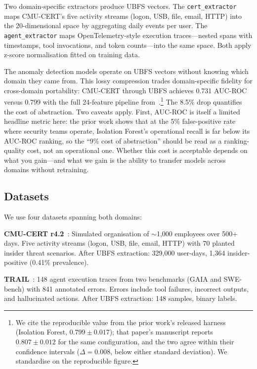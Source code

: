 \documentclass[conference]{IEEEtran}
\begin{document}
Two domain-specific extractors produce UBFS vectors. The \texttt{cert\_extractor} maps CMU-CERT's five activity streams (logon, USB, file, email, HTTP) into the 20-dimensional space by aggregating daily events per user. The \texttt{agent\_extractor} maps OpenTelemetry-style execution traces---nested spans with timestamps, tool invocations, and token counts---into the same space. Both apply z-score normalisation fitted on training data.

The anomaly detection models operate on UBFS vectors without knowing which domain they came from. This lossy compression trades domain-specific fidelity for cross-domain portability: CMU-CERT through UBFS achieves 0.731 AUC-ROC versus 0.799 with the full 24-feature pipeline from~\cite{rimal2026insider}.\footnote{We cite the reproducible value from the prior work's released harness (Isolation Forest, $0.799 \pm 0.017$); that paper's manuscript reports $0.807 \pm 0.012$ for the same configuration, and the two agree within their confidence intervals ($\Delta{=}0.008$, below either standard deviation). We standardise on the reproducible figure.} The 8.5\% drop quantifies the cost of abstraction. Two caveats apply. First, AUC-ROC is itself a limited headline metric here: the prior work shows that at the 5\% false-positive rate where security teams operate, Isolation Forest's operational recall is far below its AUC-ROC ranking, so the ``9\% cost of abstraction'' should be read as a ranking-quality cost, not an operational one. Whether this cost is acceptable depends on what you gain---and what we gain is the ability to transfer models across domains without retraining.

\subsection{Datasets}
\label{sec:datasets}

We use four datasets spanning both domains:

\textbf{CMU-CERT r4.2}~\cite{glasser2013bridging}: Simulated organisation of ${\sim}$1,000 employees over 500+ days. Five activity streams (logon, USB, file, email, HTTP) with 70 planted insider threat scenarios. After UBFS extraction: 329,000 user-days, 1,364 insider-positive (0.41\% prevalence).

\textbf{TRAIL}~\cite{patronus2024trail}: 148 agent execution traces from two benchmarks (GAIA and SWE-bench) with 841 annotated errors. Errors include tool failures, incorrect outputs, and hallucinated actions. After UBFS extraction: 148 samples, binary labels.
\end{document}

